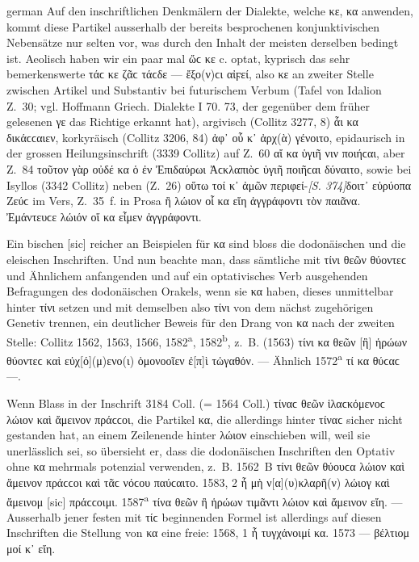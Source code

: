 \begin{otherlanguage*}{german}
Auf den inschriftlichen Denkmälern der Dialekte, welche κε, κα anwenden, kommt diese Partikel ausserhalb der bereits besprochenen konjunktivischen Nebensätze nur selten vor, was durch den Inhalt der meisten derselben bedingt ist. Aeolisch haben wir ein paar mal ὤϲ κε c. optat, kyprisch das sehr bemerkenswerte τάϲ κε ζᾶϲ τάϲδε — ἔξο(ν)ϲι αἰϝεί, also κε an zweiter Stelle zwischen Artikel und Substantiv bei futurischem Verbum (Tafel von Idalion Z.~30; vgl. Hoffmann Griech. Dialekte I 70. 73, der gegenüber dem früher gelesenen γε das Richtige erkannt hat), argivisch (Collitz 3277, 8) ἇι κα δικάϲϲαιεν, korkyräisch (Collitz 3206, 84) ἀφ᾽ οὗ κ᾽ ἀρχ(ὰ) γένοιτο, epidaurisch in der grossen Heilungsinschrift (3339 Collitz) auf Z.~60 αἴ κα ὑγιῆ νιν ποιήϲαι, aber Z.~84 τοῦτον γὰρ οὐδέ κα ὁ ἐν Ἐπιδαύρωι Ἀϲκλαπιὸϲ ὑγιῆ ποιῆϲαι δύναιτο, sowie bei Isyllos (3342 Collitz) neben (Z.~26) οὕτω τοί κ᾽ ἀμῶν περιφεί-\hypertarget{p374}{\emph{[S. 374]}}\label{p374}δοιτ᾽ εὐρύοπα Ζεύϲ im Vers, Z.~35~f. in Prosa ἢ λώιον οἷ κα εἴη ἀγγράφοντι τὸν παιᾶνα. Ἐμάντευϲε λώιόν οἵ κα εἶμεν ἀγγράφοντι.

Ein bischen [sic] reicher an Beispielen für κα sind bloss die dodonäischen und die eleischen Inschriften. Und nun beachte man, dass sämtliche mit τίνι θεῶν θύοντεϲ und Ähnlichem anfangenden und auf ein optativisches Verb ausgehenden Befragungen des dodonäischen Orakels, wenn sie κα haben, dieses unmittelbar hinter τίνι setzen und mit demselben also τίνι von dem nächst zugehörigen Genetiv trennen, ein deutlicher Beweis für den Drang von κα nach der zweiten Stelle: Collitz 1562, 1563, 1566, 1582\textsuperscript{a}, 1582\textsuperscript{b}, z.~B. (1563) τίνι κα θεῶν [ἢ] ἡρώων θύοντεϲ καὶ εὐχ[ό](μ)ενο(ι) ὁμονοοῖεν ἐ[π]ὶ τὠγαθόν. — Ähnlich 1572\textsuperscript{a} τί κα θύϲαϲ —.

Wenn Blass in der Inschrift 3184 Coll. (= 1564 Coll.) τίναϲ θεῶν ἱλαϲκόμενοϲ λώιον καὶ ἄμεινον πράϲϲοι, die Partikel κα, die allerdings hinter τίναϲ sicher nicht gestanden hat, an einem Zeilenende hinter λώιον einschieben will, weil sie unerlässlich sei, so übersieht er, dass die dodonäischen Inschriften den Optativ ohne κα mehrmals potenzial verwenden, z.~B. 1562~B τίνι θεῶν θύουϲα λώιον καὶ ἄμεινον πράϲϲοι καὶ τᾶϲ νόϲου παύϲαιτο. 1583, 2 ἦ μὴ ν[α](υ)κλαρῆ(ν) λώιογ καὶ ἄμεινομ [sic] πράϲϲοιμι. 1587\textsuperscript{a} τίνα θεῶν ἢ ἡρώων τιμᾶντι λώιον καὶ ἄμεινον εἴη. — Ausserhalb jener festen mit τίϲ beginnenden Formel ist allerdings auf diesen Inschriften die Stellung von κα eine freie: 1568, 1 ἦ τυγχάνοιμί κα. 1573 — βέλτιομ μοί κ᾽ εἴη.


\end{otherlanguage*}
